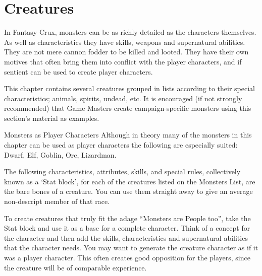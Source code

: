 \chapter{Creatures}
\label{ch:creatures}


In Fantasy Crux, monsters can be as richly detailed as the characters themselves. As well as characteristics they have skills, weapons and supernatural abilities. They are not mere cannon fodder to be killed and looted. They have their own motives that often bring them into conflict with the player characters, and if sentient can be used to create player characters.

\vspace{1em}

This chapter contains several creatures grouped in lists according to their special characteristics; animals, spirits, undead, etc. It is encouraged (if not strongly recommended) that Game Masters create campaign-specific monsters using this section's material as examples.

\vspace{2em}

\begin{rpg-titlebox}{Monsters as Player Characters}
Although in theory many of the monsters in this chapter can be used as player characters the following are especially suited: Dwarf, Elf, Goblin, Orc, Lizardman. %
\end{rpg-titlebox}
  
\vspace{2em}

The following characteristics, attributes, skills, and special rules, collectively known as a ‘Stat block’, for each of the creatures listed on the Monsters List, are the bare bones of a creature. You can use them straight away to give an average non-descript member of that race.

\vspace{1em}

To create creatures that truly fit the adage “Monsters are People too”, take the Stat block and use it as a base for a complete character. Think of a concept for the character and then add the skills, characteristics and supernatural abilities that the character needs. You may want to generate the creature character as if it was a player character. This often creates good opposition for the players, since the creature will be of comparable experience. 

